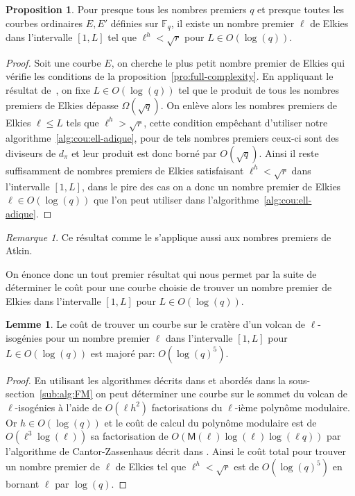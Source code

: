 \documentclass[10pt,a4paper]{book}
\theoremstyle{plain}
\theoremstyle{definition}
\theoremstyle{definition}
\newtheorem{lem}[thm]{Lemme}
\theoremstyle{definition}
\theoremstyle{definition}
\newtheorem{prop}[thm]{Proposition}
\theoremstyle{definition}
\theoremstyle{remark}
\newtheorem{rem}[thm]{Remarque}
\theoremstyle{remark}
\theoremstyle{definition}
\begin{document}
\begin{prop}
\label{pro:bor:ell}
Pour presque tous les nombres premiers $q$ et presque toutes les courbes 
ordinaires $E,E'$ définies sur $\mathbb{F}_q$, il existe un nombre premier 
$\ell$ de Elkies 
dans l'intervalle $[1,L]$ tel que $\ell^h < \sqrt{r}$ pour $L \in O(\log(q))$.
\end{prop}

\begin{proof}
Soit une courbe $E$, on cherche le plus petit nombre premier de Elkies qui 
  vérifie les conditions de la proposition~\ref{pro:full-complexity}.
  En appliquant le résultat de~\cite[Theorem~1]{ShparlinskiSutherland14},
  on fixe $L \in O(\log(q))$ tel que le produit de tous les nombres premiers 
  de Elkies dépasse $\Omega(\sqrt{q})$. On enlève alors les nombres premiers 
  de Elkies $\ell \leqslant L$ tels que $\ell^{h} > \sqrt{r}$, cette condition
  empêchant d'utiliser notre algorithme~\ref{alg:cou:ell-adique}, 
  pour de tels nombres premiers ceux-ci sont des diviseurs de $d_{\pi}$ et leur 
  produit est donc borné par $O(\sqrt{q})$. Ainsi il reste suffisamment de 
  nombres premiers de Elkies satisfaisant $\ell^{h} < \sqrt{r}$ dans 
  l'intervalle  $[1,L]$, dans le pire des cas on a donc un nombre premier de
  Elkies $\ell \in O(\log(q))$ que l'on peut utiliser dans 
  l'algorithme~\ref{alg:cou:ell-adique}.
\end{proof}

\begin{rem}
Ce résultat comme le \cite[Theorem~1]{ShparlinskiSutherland14} s'applique aussi
aux nombres premiers de Atkin.
\end{rem}

On énonce donc un tout premier résultat qui nous permet par la suite de
déterminer le coût pour une courbe choisie de trouver un nombre premier de 
Elkies dans l'intervalle $[1,L]$ pour $L \in O(\log(q))$.
\begin{lem}
\label{lem:cou:dec}
Le coût de trouver un courbe sur le cratère d'un volcan de $\ell$-isogénies 
pour un nombre premier $\ell$ dans l'intervalle $[1,L]$ pour $L \in O(\log(q))$
est majoré par: $O(\log(q)^5)$.
\end{lem}

\begin{proof}
En utilisant les algorithmes décrits dans \cite{FouquetMorain02} et abordés 
dans la sous-section~\ref{sub:alg:FM} on peut déterminer une courbe sur le 
sommet du volcan de $\ell$-isogénies à l'aide de $O(\ell h^2)$ 
  factorisations du $\ell$-ième polynôme modulaire. Or $h \in O(\log(q))$ et
  le coût de calcul du polynôme modulaire est de $O(\ell^3\log(\ell))$ sa factorisation de 
  $O(\mathsf{M}(\ell)\log(\ell)\log(\ell q))$ par l'algorithme de 
  Cantor-Zassenhaus décrit dans \cite[Chapter~14.5]{vzGJG03}. Ainsi le coût 
  total pour trouver un nombre premier de $\ell$ de Elkies tel que $\ell^h<\sqrt{r}$  est de
  $O(\log(q)^5)$ en bornant $\ell$ par $\log(q)$.
\end{proof}
\end{document}
